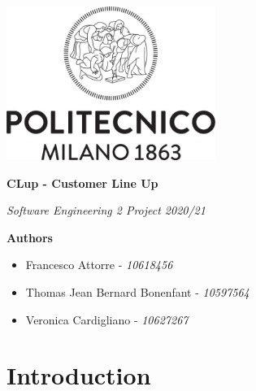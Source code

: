 \documentclass{article}
\begin{document}

  \begin{titlepage}

    \begin{center}
    \includegraphics[height=5cm]{Logo_Polimi}\\
    \vspace{7cm}
      \begin{huge}
        \textbf{CLup - Customer Line Up}\\
      \end{huge}
      \vspace{0.3cm}
      \begin{large}
        \textit{Software Engineering 2 Project 2020/21}\\
      \end{large}
      
      \vfill
      \begin{author}
        \textbf{\Large Authors}\\
        \begin{itemize}
          \item Francesco Attorre - \textit{10618456}\\
          \item Thomas Jean Bernard Bonenfant - \textit{10597564}\\
          \item Veronica Cardigliano - \textit{10627267}\\
        \end{itemize}
      \end{author}

    \end{center}
  
  \end{titlepage}
  
  
    \section{Introduction}
    	\renewcommand{\thesubsection}{\Alph{subsection}}
\end{document}
